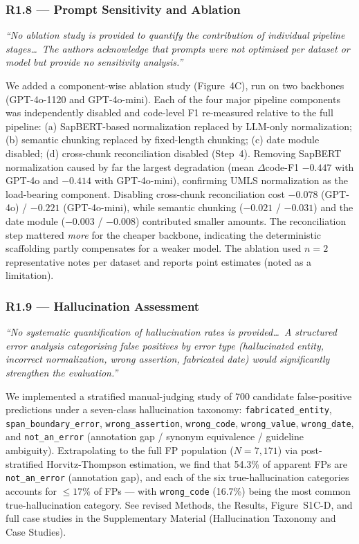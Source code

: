 \documentclass[11pt,letterpaper]{article}
\newcommand{\reviewer}[1]{\par\medskip\textcolor{blue!75!black}{\textit{#1}}\par\medskip}
\newcommand{\response}[1]{\par#1\par\medskip}
\begin{document}
\subsubsection*{R1.8 --- Prompt Sensitivity and Ablation}
\reviewer{``No ablation study is provided to quantify the contribution of individual pipeline stages\dots\ The authors acknowledge that prompts were not optimised per dataset or model but provide no sensitivity analysis.''}
\response{We added a component-wise ablation study (Figure~4C), run on two backbones (GPT-4o-1120 and GPT-4o-mini). Each of the four major pipeline components was independently disabled and code-level F1 re-measured relative to the full pipeline: (a) SapBERT-based normalization replaced by LLM-only normalization; (b) semantic chunking replaced by fixed-length chunking; (c) date module disabled; (d) cross-chunk reconciliation disabled (Step~4). Removing SapBERT normalization caused by far the largest degradation (mean $\Delta$code-F1 $-0.447$ with GPT-4o and $-0.414$ with GPT-4o-mini), confirming UMLS normalization as the load-bearing component. Disabling cross-chunk reconciliation cost $-0.078$ (GPT-4o) / $-0.221$ (GPT-4o-mini), while semantic chunking ($-0.021$ / $-0.031$) and the date module ($-0.003$ / $-0.008$) contributed smaller amounts. The reconciliation step mattered \emph{more} for the cheaper backbone, indicating the deterministic scaffolding partly compensates for a weaker model. The ablation used $n=2$ representative notes per dataset and reports point estimates (noted as a limitation).}

\subsubsection*{R1.9 --- Hallucination Assessment}
\reviewer{``No systematic quantification of hallucination rates is provided\dots\ A structured error analysis categorising false positives by error type (hallucinated entity, incorrect normalization, wrong assertion, fabricated date) would significantly strengthen the evaluation.''}
\response{We implemented a stratified manual-judging study of 700 candidate false-positive predictions under a seven-class hallucination taxonomy: \texttt{fabricated\_entity}, \texttt{span\_boundary\_error}, \texttt{wrong\_assertion}, \texttt{wrong\_code}, \texttt{wrong\_value}, \texttt{wrong\_date}, and \texttt{not\_an\_error} (annotation gap / synonym equivalence / guideline ambiguity). Extrapolating to the full FP population ($N=7{,}171$) via post-stratified Horvitz-Thompson estimation, we find that 54.3\% of apparent FPs are \texttt{not\_an\_error} (annotation gap), and each of the six true-hallucination categories accounts for $\leq 17\%$ of FPs --- with \texttt{wrong\_code} (16.7\%) being the most common true-hallucination category. See revised Methods, the Results, Figure~S1C-D, and full case studies in the Supplementary Material (Hallucination Taxonomy and Case Studies).}
\end{document}
